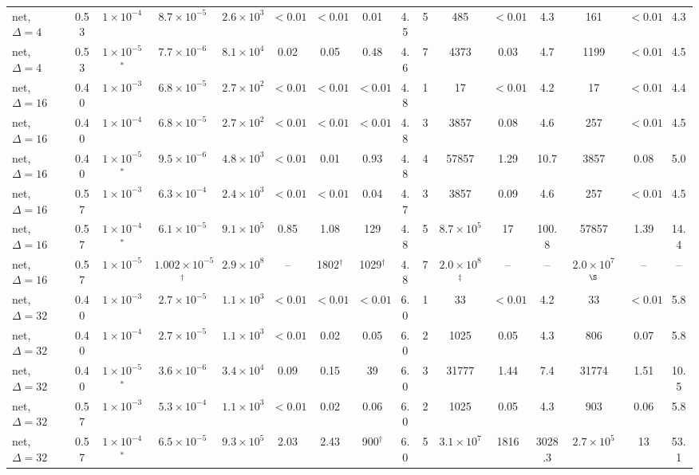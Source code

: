 \documentclass[aps,pra,superscriptaddress,floatfix,longbibliography,twocolumn]{revtex4-2}
\begin{document}
\begin{table}[t]
\begin{ruledtabular}
\begin{tabular}{lcc|cccccc|cccc|ccc}
net, $\Delta=4$ & 0.53 & $1\times10^{-4}$ & $8.7\times10^{-5}$ & $2.6\times10^{3}$ & $<0.01$ & $<0.01$ & 0.01 & 4.5 & 5 & 485 & $<0.01$ & 4.3 & 161 & $<0.01$ & 4.3 \\
net, $\Delta=4$ & 0.53 & $1\times10^{-5}$$^*$ & $7.7\times10^{-6}$ & $8.1\times10^{4}$ & 0.02 & 0.05 & 0.48 & 4.6 & 7 & 4373 & 0.03 & 4.7 & 1199 & $<0.01$ & 4.5 \\
net, $\Delta=16$ & 0.40 & $1\times10^{-3}$ & $6.8\times10^{-5}$ & $2.7\times10^{2}$ & $<0.01$ & $<0.01$ & $<0.01$ & 4.8 & 1 & 17 & $<0.01$ & 4.2 & 17 & $<0.01$ & 4.4 \\
net, $\Delta=16$ & 0.40 & $1\times10^{-4}$ & $6.8\times10^{-5}$ & $2.7\times10^{2}$ & $<0.01$ & $<0.01$ & $<0.01$ & 4.8 & 3 & 3857 & 0.08 & 4.6 & 257 & $<0.01$ & 4.5 \\
net, $\Delta=16$ & 0.40 & $1\times10^{-5}$$^*$ & $9.5\times10^{-6}$ & $4.8\times10^{3}$ & $<0.01$ & 0.01 & 0.93 & 4.8 & 4 & 57857 & 1.29 & 10.7 & 3857 & 0.08 & 5.0 \\
net, $\Delta=16$ & 0.57 & $1\times10^{-3}$ & $6.3\times10^{-4}$ & $2.4\times10^{3}$ & $<0.01$ & $<0.01$ & 0.04 & 4.7 & 3 & 3857 & 0.09 & 4.6 & 257 & $<0.01$ & 4.5 \\
net, $\Delta=16$ & 0.57 & $1\times10^{-4}$$^*$ & $6.1\times10^{-5}$ & $9.1\times10^{5}$ & 0.85 & 1.08 & 129 & 4.8 & 5 & $8.7\times10^{5}$ & 17 & 100.8 & 57857 & 1.39 & 14.4 \\
net, $\Delta=16$ & 0.57 & $1\times10^{-5}$ & $1.002\times10^{-5}$$^{\dagger}$ & $2.9\times10^{8}$ & -- & 1802$^{\dagger}$ & 1029$^{\dagger}$ & 4.8 & 7 & $2.0\times10^{8}$$^{\ddagger}$ & -- & -- & $2.0\times10^{7}$$^{\S}$ & -- & -- \\
net, $\Delta=32$ & 0.40 & $1\times10^{-3}$ & $2.7\times10^{-5}$ & $1.1\times10^{3}$ & $<0.01$ & $<0.01$ & $<0.01$ & 6.0 & 1 & 33 & $<0.01$ & 4.2 & 33 & $<0.01$ & 5.8 \\
net, $\Delta=32$ & 0.40 & $1\times10^{-4}$ & $2.7\times10^{-5}$ & $1.1\times10^{3}$ & $<0.01$ & 0.02 & 0.05 & 6.0 & 2 & 1025 & 0.05 & 4.3 & 806 & 0.07 & 5.8 \\
net, $\Delta=32$ & 0.40 & $1\times10^{-5}$$^*$ & $3.6\times10^{-6}$ & $3.4\times10^{4}$ & 0.09 & 0.15 & 39 & 6.0 & 3 & 31777 & 1.44 & 7.4 & 31774 & 1.51 & 10.5 \\
net, $\Delta=32$ & 0.57 & $1\times10^{-3}$ & $5.3\times10^{-4}$ & $1.1\times10^{3}$ & $<0.01$ & 0.02 & 0.06 & 6.0 & 2 & 1025 & 0.05 & 4.3 & 903 & 0.06 & 5.8 \\
net, $\Delta=32$ & 0.57 & $1\times10^{-4}$$^*$ & $6.5\times10^{-5}$ & $9.3\times10^{5}$ & 2.03 & 2.43 & 900$^{\dagger}$ & 6.0 & 5 & $3.1\times10^{7}$ & 1816 & 3028.3 & $2.7\times10^{5}$ & 13 & 53.1 \\

\end{tabular}
\end{ruledtabular}
\end{table}
\end{document}
